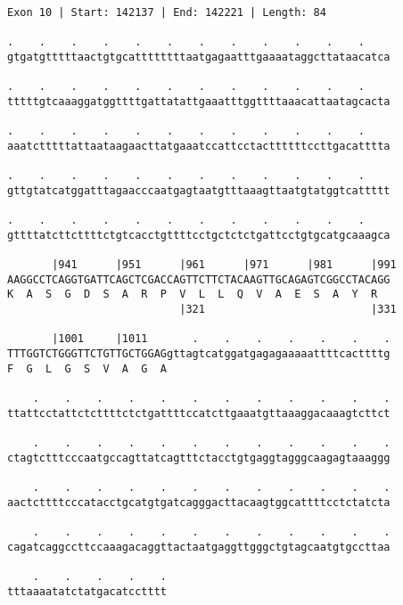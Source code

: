 \documentclass{article}
\begin{document}
\begin{Verbatim}[fontfamily=courier]
Exon 10 | Start: 142137 | End: 142221 | Length: 84

.    .    .    .    .    .    .    .    .    .    .    .    
gtgatgtttttaactgtgcattttttttaatgagaatttgaaaataggcttataacatca

.    .    .    .    .    .    .    .    .    .    .    .    
tttttgtcaaaggatggttttgattatattgaaatttggttttaaacattaatagcacta

.    .    .    .    .    .    .    .    .    .    .    .    
aaatctttttattaataagaacttatgaaatccattcctacttttttccttgacatttta

.    .    .    .    .    .    .    .    .    .    .    .    
gttgtatcatggatttagaacccaatgagtaatgtttaaagttaatgtatggtcattttt

.    .    .    .    .    .    .    .    .    .    .    .    
gttttatcttcttttctgtcacctgttttcctgctctctgattcctgtgcatgcaaagca

       |941      |951      |961      |971      |981      |991
AAGGCCTCAGGTGATTCAGCTCGACCAGTTCTTCTACAAGTTGCAGAGTCGGCCTACAGG
K  A  S  G  D  S  A  R  P  V  L  L  Q  V  A  E  S  A  Y  R  
                           |321                          |331

       |1001     |1011       .    .    .    .    .    .    .
TTTGGTCTGGGTTCTGTTGCTGGAGgttagtcatggatgagagaaaaattttcacttttg
F  G  L  G  S  V  A  G  A                                   

    .    .    .    .    .    .    .    .    .    .    .    .
ttattcctattctcttttctctgattttccatcttgaaatgttaaaggacaaagtcttct

    .    .    .    .    .    .    .    .    .    .    .    .
ctagtctttcccaatgccagttatcagtttctacctgtgaggtagggcaagagtaaaggg

    .    .    .    .    .    .    .    .    .    .    .    .
aactcttttcccatacctgcatgtgatcagggacttacaagtggcattttcctctatcta

    .    .    .    .    .    .    .    .    .    .    .    .
cagatcaggccttccaaagacaggttactaatgaggttgggctgtagcaatgtgccttaa

    .    .    .    .    .
tttaaaatatctatgacatcctttt
\end{Verbatim}
\newpage
\end{document}
